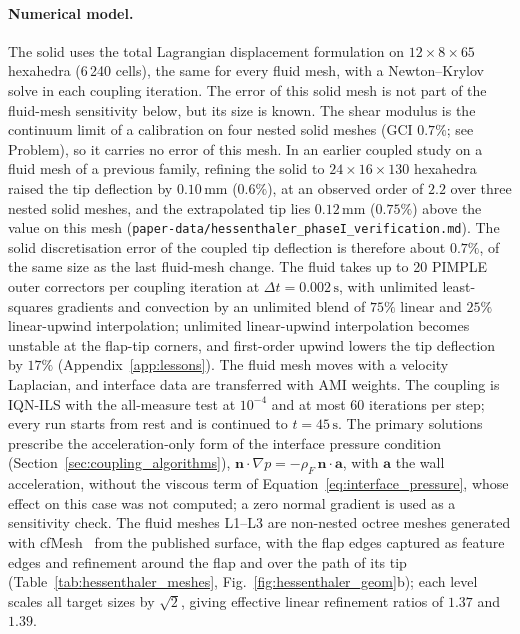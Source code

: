 \paragraph{Numerical model.}
The solid uses the total Lagrangian displacement formulation on $12 \times 8 \times 65$ hexahedra (6\,240 cells), the same for every fluid mesh, with a Newton--Krylov solve in each coupling iteration.
The error of this solid mesh is not part of the fluid-mesh sensitivity below, but its size is known. The shear modulus is the continuum limit of a calibration on four nested solid meshes (GCI $0.7\%$; see Problem), so it carries no error of this mesh. In an earlier coupled study on a fluid mesh of a previous family, refining the solid to $24\times16\times130$ hexahedra raised the tip deflection by $0.10\,\mathrm{mm}$ ($0.6\%$), at an observed order of $2.2$ over three nested solid meshes, and the extrapolated tip lies $0.12\,\mathrm{mm}$ ($0.75\%$) above the value on this mesh (\texttt{paper-data/hessenthaler\_phaseI\_verification.md}). The solid discretisation error of the coupled tip deflection is therefore about $0.7\%$, of the same size as the last fluid-mesh change.
The fluid takes up to 20 PIMPLE outer correctors per coupling iteration at $\Delta t = 0.002\,\mathrm{s}$, with unlimited least-squares gradients and convection by an unlimited blend of $75\%$ linear and $25\%$ linear-upwind interpolation; unlimited linear-upwind interpolation becomes unstable at the flap-tip corners, and first-order upwind lowers the tip deflection by $17\%$ (Appendix~\ref{app:lessons}).
The fluid mesh moves with a velocity Laplacian, and interface data are transferred with AMI weights.
The coupling is IQN-ILS with the all-measure test at $10^{-4}$ and at most 60 iterations per step; every run starts from rest and is continued to $t = 45\,\mathrm{s}$.
The primary solutions prescribe the acceleration-only form of the interface pressure condition (Section~\ref{sec:coupling_algorithms}), $\mathbf{n}\cdot\nabla p = -\rho_F\,\mathbf{n}\cdot\mathbf{a}$, with $\mathbf{a}$ the wall acceleration, without the viscous term of Equation~\eqref{eq:interface_pressure}, whose effect on this case was not computed; a zero normal gradient is used as a sensitivity check.
The fluid meshes L1--L3 are non-nested octree meshes generated with cfMesh~\citep{Juretic2015cfMesh} from the published surface, with the flap edges captured as feature edges and refinement around the flap and over the path of its tip (Table~\ref{tab:hessenthaler_meshes}, Fig.~\ref{fig:hessenthaler_geom}b); each level scales all target sizes by $\sqrt{2}$, giving effective linear refinement ratios of $1.37$ and $1.39$.

